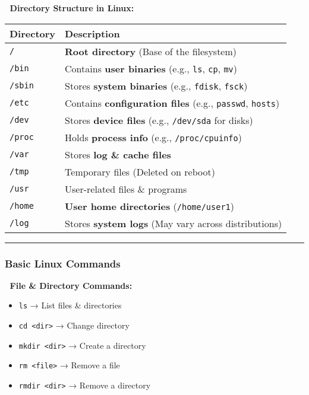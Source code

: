 \documentclass[
]{article}
\providecommand{\tightlist}{%
  \setlength{\itemsep}{0pt}\setlength{\parskip}{0pt}}
\begin{document}
📌 \textbf{Directory Structure in Linux:}

\begin{longtable}[]{@{}ll@{}}
\toprule\noalign{}
\textbf{Directory} & \textbf{Description} \\
\midrule\noalign{}
\endhead
\bottomrule\noalign{}
\endlastfoot
\texttt{/} & \textbf{Root directory} (Base of the filesystem) \\
\texttt{/bin} & Contains \textbf{user binaries} (e.g., \texttt{ls},
\texttt{cp}, \texttt{mv}) \\
\texttt{/sbin} & Stores \textbf{system binaries} (e.g., \texttt{fdisk},
\texttt{fsck}) \\
\texttt{/etc} & Contains \textbf{configuration files} (e.g.,
\texttt{passwd}, \texttt{hosts}) \\
\texttt{/dev} & Stores \textbf{device files} (e.g., \texttt{/dev/sda}
for disks) \\
\texttt{/proc} & Holds \textbf{process info} (e.g.,
\texttt{/proc/cpuinfo}) \\
\texttt{/var} & Stores \textbf{log \& cache files} \\
\texttt{/tmp} & Temporary files (Deleted on reboot) \\
\texttt{/usr} & User-related files \& programs \\
\texttt{/home} & \textbf{User home directories}
(\texttt{/home/user1}) \\
\texttt{/log} & Stores \textbf{system logs} (May vary across
distributions) \\
\end{longtable}

\begin{center}\rule{0.5\linewidth}{0.5pt}\end{center}

\subsubsection{\texorpdfstring{\textbf{Basic Linux
Commands}}{Basic Linux Commands}}\label{basic-linux-commands}

📌 \textbf{File \& Directory Commands:}

\begin{itemize}
\tightlist
\item
  \texttt{ls} → List files \& directories
\item
  \texttt{cd\ \textless{}dir\textgreater{}} → Change directory
\item
  \texttt{mkdir\ \textless{}dir\textgreater{}} → Create a directory
\item
  \texttt{rm\ \textless{}file\textgreater{}} → Remove a file
\item
  \texttt{rmdir\ \textless{}dir\textgreater{}} → Remove a directory
\end{itemize}
\end{document}
